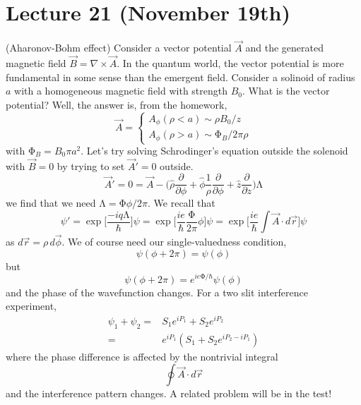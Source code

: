 \section{Lecture 21 (November 19th)}
\begin{defi}
(Aharonov-Bohm effect) Consider a vector potential $\vec{A}$ and the generated magnetic field $\vec{B}=\nabla \times \vec{A}$. In the quantum world, the vector potential is more fundamental in some sense than the emergent field. Consider a solinoid of radius $a$ with a homogeneous magnetic field with strength $B_0$. What is the vector potential? Well, the answer is, from the homework,
\[\vec{A}=\begin{cases}
A_{\phi }(\rho <a)\sim \rho B_{0}/z\\
A_{\phi }(\rho >a)\sim \mathrm{\Phi} _{B}/2\pi \rho 
\end{cases}\]
with $\mathrm{\Phi} _{B}=B_0\pi a^2$. Let's try solving Schrodinger's equation outside the solenoid with $\vec{B}=0$ by trying to set $\vec{A}'=0$ outside. 
\[\vec{A}'=0=\vec{A}-\Big(\hat{\rho }\dfrac{\partial }{\partial \phi }+\hat{\phi }\dfrac{1}{\rho }\dfrac{\partial }{\partial \phi }+\hat{z}\dfrac{\partial }{\partial z}\Big)\mathrm{\Lambda } \]
we find that we need $\mathrm{\Lambda }=\mathrm{\Phi} \phi /2\pi $. We recall that
\[\psi' =\exp \Big[\dfrac{-iq\mathrm{\Lambda }}{\hbar }\Big]\psi =\exp \Big[\dfrac{ie}{\hbar }\dfrac{\mathrm{\Phi} }{2\pi }\phi \Big]\psi =\exp \Big[\dfrac{ie}{\hbar }\int \vec{A}\cdot d\vec{r}\Big]\psi \]
as $d\vec{r}=\rho \,d\vec{\phi }$. We of course need our single-valuedness condition,
\[\psi (\phi +2\pi )=\psi(\phi ) \]
but
\[\psi (\phi +2\pi )=e^{ie\mathrm{\Phi} /\hbar }\psi (\phi )\]
and the phase of the wavefunction changes. For a two slit interference experiment,
\[\begin{align*}
\psi_1+\psi_2=&S_1e^{iP_1}+S_2e^{iP_2}\\
=&e^{iP_1}(S_1+S_2e^{iP_2-iP_1})
\end{align*}\]
where the phase difference is affected by the nontrivial integral
\[\oint \vec{A}\cdot d\vec{r} \]
and the interference pattern changes. A related problem will be in the test! 
\end{defi}
\vspace{2ex}
